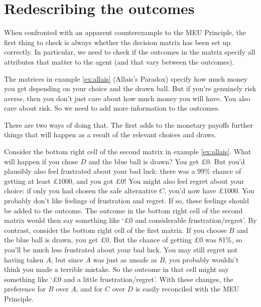 
\section{Redescribing the outcomes}

When confronted with an apparent counterexample to the MEU Principle,
the first thing to check is always whether the decision matrix has
been set up correctly. In particular, we need to check if the outcomes
in the matrix specify all attributes that matter to the agent (and
that vary between the outcomes).

The matrices in example \ref{ex:allais} (Allais's Paradox) specify how
much money you get depending on your choice and the drawn ball. But if
you're genuinely risk averse, then you don't just care about how much
money you will have. You also care about risk. So we need to add more
information to the outcomes.

There are two ways of doing that. The first adds to the monetary
payoffs further things that will happen as a result of the relevant
choices and draws.

Consider the bottom right cell of the second matrix in example
\ref{ex:allais}. What will happen if you chose $D$ and the blue ball
is drawn? You get £0. But you'd plausibly also feel frustrated about
your bad luck: there was a 99\% chance of getting at least £1000, and
you got £0! You might also feel regret about your choice: if only you
had chosen the safe alternative $C$, you'd now have £1000. You
probably don't like feelings of frustration and regret. If so, these
feelings should be added to the outcome. The outcome in the bottom
right cell of the second matrix would then say something like `£0 and
considerable frustration/regret'. By contrast, consider the bottom
right cell of the first matrix. If you choose $B$ and the blue ball is
drawn, you get £0. But the chance of getting £0 was 81\%, so you'll be
much less frustrated about your bad luck. You may still regret not
having taken $A$, but since $A$ was just as unsafe as $B$, you
probably wouldn't think you made a terrible mistake. So the outcome in
that cell might say something like `£0 and a little
frustration/regret'. With these changes, the preference for $B$ over
$A$, and for $C$ over $D$ is easily reconciled with the MEU Principle.

